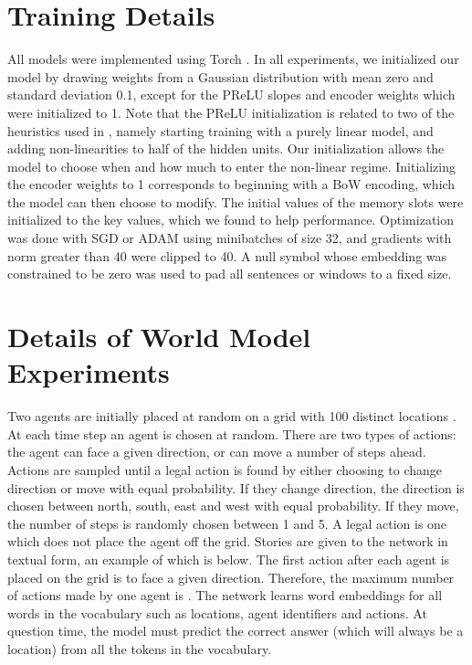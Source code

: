 \documentclass{article} \usepackage{iclr2016_conference,times}
\begin{document}



\appendix

\section{Training Details}\label{sec:training_details}

All models were implemented using Torch \citep{Torch7}.
In all experiments, we initialized our model by drawing weights from a Gaussian distribution with mean zero and standard deviation 0.1, except for the PReLU slopes and encoder weights which were initialized to 1. 
Note that the PReLU initialization is related to two of the heuristics used in \citep{MemN2N}, namely starting training with a purely linear model, and adding non-linearities to half of the hidden units. Our initialization allows the model to choose when and how much to enter the non-linear regime.
Initializing the encoder weights to 1 corresponds to beginning with a BoW encoding, which the model can then choose to modify.
The initial values of the memory slots were initialized to the key values, which we found to help performance.
Optimization was done with SGD or ADAM using minibatches of size 32, and gradients with norm greater than 40 were clipped to 40. 
A null symbol whose embedding was constrained to be zero was used to pad all sentences or windows to a fixed size.



\section{Details of World Model Experiments}\label{sec:world_model}

Two agents are initially placed at random on a  grid with 100 distinct locations .
At each time step an agent is chosen at random. 
There are two types of actions: the agent can face a given direction, or can move a number of steps ahead.
Actions are sampled until a legal action is found by either choosing to change direction or move with equal probability. If they change direction, the direction is chosen between north, south, east and west with equal probability. If they move, the number of steps is randomly chosen between 1 and 5. A legal action is one which does not place the agent off the grid.
Stories are given to the network in textual form, an example of which is below. The first action after each agent is placed on the grid is to face a given direction. 
Therefore, the maximum number of actions made by one agent is . 
The network learns word embeddings for all words in the vocabulary such as locations, agent identifiers and actions.
At question time, the model must predict the correct answer (which will always be a location) from all the tokens in the vocabulary.
\end{document}
